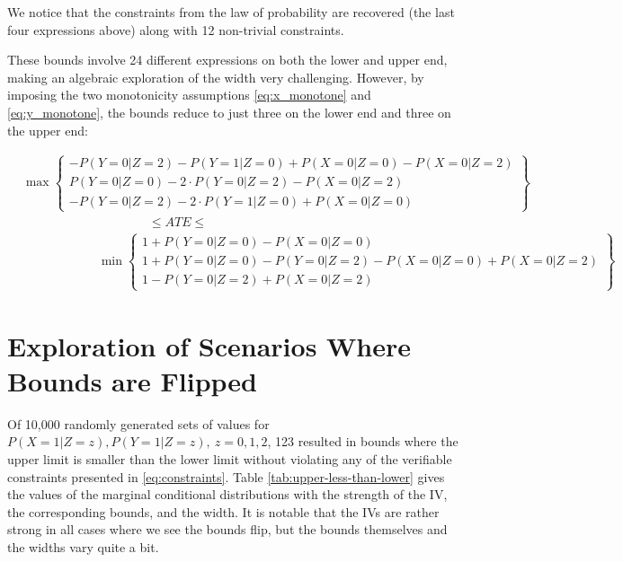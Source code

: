 \documentclass[
]{article}
\theoremstyle{plain}
\begin{document}
{We notice that the constraints from the law of probability are recovered (the last four expressions above) along with 12 non-trivial constraints.

These bounds involve 24 different expressions on both the lower and upper end, making an algebraic exploration of the width very challenging. However, by imposing the two monotonicity assumptions \eqref{eq:x_monotone} and \eqref{eq:y_monotone}, the bounds reduce to just three on the lower end and three on the upper end:

\[
\begin{aligned}
    &\max
      \begin{Bmatrix}
        -P(Y = 0 | Z = 2) - P(Y = 1 | Z = 0) + P(X = 0 | Z = 0) - P(X = 0 | Z = 2) \\
        P(Y = 0 | Z = 0) - 2\cdot P(Y = 0 | Z = 2) - P(X = 0 | Z = 2) \\
        -P(Y = 0 | Z = 2) - 2\cdot P(Y = 1 | Z = 0) + P(X = 0 | Z = 0)
      \end{Bmatrix} \\
    &\qquad \qquad \qquad \qquad \qquad\le ATE \le \\
    &\qquad \qquad \qquad \min
      \begin{Bmatrix}
        1 + P(Y = 0 | Z = 0) - P(X = 0 | Z = 0) \\
        1 + P(Y = 0 | Z = 0) - P(Y = 0 | Z = 2) - P(X = 0 | Z = 0) + P(X = 0 | Z = 2) \\
        1 - P(Y = 0 | Z = 2) +  P(X = 0 | Z = 2)
      \end{Bmatrix}
\end{aligned}
\]


\hypertarget{exploration-of-scenarios-where-bounds-are-flipped}{%
\section{Exploration of Scenarios Where Bounds are Flipped}\label{exploration-of-scenarios-where-bounds-are-flipped}}

Of 10,000 randomly generated sets of values for \(P(X = 1 | Z = z), P(Y = 1 | Z = z),\ z = 0,1,2\), 123 resulted in bounds where the upper limit is smaller than the lower limit without violating any of the verifiable constraints presented in \eqref{eq:constraints}. Table \ref{tab:upper-less-than-lower} gives the values of the marginal conditional distributions with the strength of the IV, the corresponding bounds, and the width. It is notable that the IVs are rather strong in all cases where we see the bounds flip, but the bounds themselves and the widths vary quite a bit.

}
\end{document}

